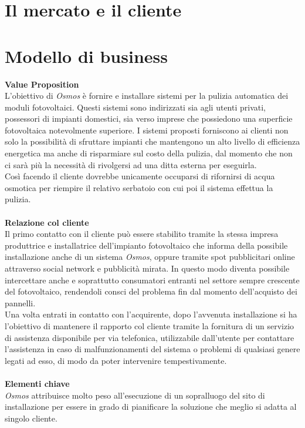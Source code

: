 \documentclass[a4paper, 12pt]{article}
\begin{document}
	\section{Il mercato e il cliente}
	\section{Modello di business}
	\textbf{Value Proposition}\\
	L'obiettivo di \emph{Osmos} è fornire e installare sistemi per la pulizia automatica dei moduli fotovoltaici. Questi sistemi sono indirizzati sia agli utenti privati, possessori di impianti domestici, sia verso imprese che possiedono una superficie fotovoltaica notevolmente superiore. I sistemi proposti forniscono ai clienti non solo la possibilità di sfruttare impianti che mantengono un alto livello di efficienza energetica ma anche di risparmiare sul costo della pulizia, dal momento che non ci sarà più la necessità di rivolgersi ad una ditta esterna per eseguirla.\\
	Così facendo il cliente dovrebbe unicamente occuparsi di rifornirsi di acqua osmotica per riempire il relativo serbatoio con cui poi il sistema effettua la pulizia.\\\\
	\textbf{Relazione col cliente}\\
	Il primo contatto con il cliente può essere stabilito tramite la stessa impresa produttrice e installatrice dell'impianto fotovoltaico che informa della possibile installazione anche di un sistema \emph{Osmos}, oppure tramite spot pubblicitari online attraverso social network e pubblicità mirata. In questo modo diventa possibile intercettare anche e soprattutto consumatori entranti nel settore sempre crescente del fotovoltaico, rendendoli consci del problema fin dal momento dell'acquisto dei pannelli.\\
	Una volta entrati in contatto con l'acquirente, dopo l'avvenuta installazione si ha l'obiettivo di mantenere il rapporto col cliente tramite la fornitura di un servizio di assistenza disponibile per via telefonica, utilizzabile dall'utente per contattare l'assistenza in caso di malfunzionamenti del sistema o problemi di qualsiasi genere legati ad esso, di modo da poter intervenire tempestivamente.\\\\
	\textbf{Elementi chiave}\\
	\emph{Osmos} attribuisce molto peso all'esecuzione di un sopralluogo del sito di installazione per essere in grado di pianificare la soluzione che meglio si adatta al singolo cliente.\\
\end{document}
